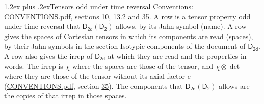\documentclass[10pt,a4paper]{article}
\makeatletter
\renewcommand\section{\@startsection{section}{1}{\z@}{-3ex plus -1ex minus -.2ex}%
  {1.2ex plus .2ex}{\normalfont\large\sffamily\bfseries\color{parttitle}}}
\numberwithin{equation}{section}
\newcommand{\grp}[1]{\mathsf{#1}}
\newcommand{\irrprod}{\otimes}
\makeatother
\begin{document}
\section{Tensors odd under time reversal}\label{s:time_odd}
Conventions: \href{../../CONVENTIONS.pdf}{CONVENTIONS.pdf}, sections \href{../../../rotation/CONVENTIONS.pdf\#conv.10}{10}, \href{../../../rotation/CONVENTIONS.pdf\#conv.13.2}{13.2} and \href{../../CONVENTIONS.pdf\#conv.35}{35}.
\leavevmode\label{n:head.name.property}A row is a tensor property odd under time reversal that $\grp{D_{2d}}(\grp{D_{2}})$ allows, by its Jahn symbol (name). \label{n:head.spaces}A row gives the spaces of Cartesian tensors in which its components are read (spaces), by their Jahn symbols in the section Isotypic components of the document of \href{../../../rotation/data/pdf/D2d.pdf}{$\grp{D_{2d}}$}. \label{n:head.properties}A row also gives the irrep of $\grp{D_{2d}}$ at which they are read and the properties in words. The irrep is $\chi$ where the spaces are those of the tensor, and $\chi \irrprod \det$ where they are those of the tensor without its axial factor e (\href{../../CONVENTIONS.pdf}{CONVENTIONS.pdf}, section \href{../../CONVENTIONS.pdf\#conv.35}{35}). The components that $\grp{D_{2d}}(\grp{D_{2}})$ allows are the copies of that irrep in those spaces.
\end{document}
